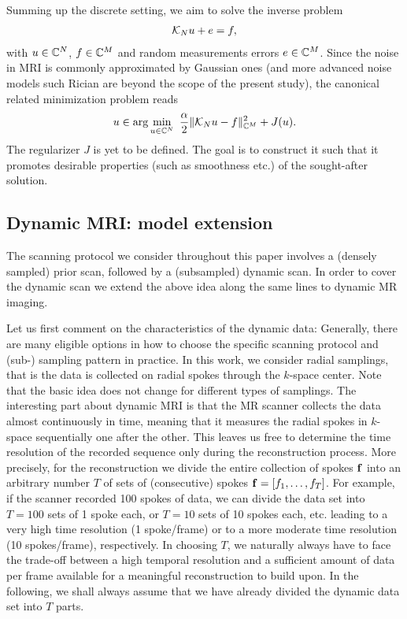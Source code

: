 Summing up the discrete setting, we aim to solve the inverse problem
\begin{align}\label{eq:forward_model}
	\mathcal{K}_N u + e = f,
\end{align}
with $u \in \mathbb{C}^N$, $f \in \mathbb{C}^M$ and random measurements errors $e \in \mathbb{C}^M$. 
Since the noise in MRI is commonly approximated by  Gaussian ones (and more advanced noise models such Rician are beyond the scope of the present study), the canonical related minimization problem reads
\begin{align*}
	u \in \arg \min_{u \in \mathbb{C}^N} ~ \frac{\alpha}{2} \| \mathcal{K}_N u - f \|_{\mathbb{C}^M}^2 + J(u).
\end{align*}
The regularizer $J$ is yet to be defined. 
The goal is to construct it such that it promotes desirable properties (such as smoothness etc.) of the sought-after solution.


\subsection{Dynamic MRI: model extension}
\label{subsec:dynamic imaging}

The scanning protocol we consider throughout this paper involves a (densely sampled) prior scan, followed by a (subsampled) dynamic scan. 
In order to cover the dynamic scan we extend the above idea along the same lines to dynamic MR imaging. 

Let us first comment on the characteristics of the dynamic data: Generally, there are many eligible options in how to choose the specific scanning protocol and (sub-) sampling pattern in practice. 
In this work, we consider radial samplings, that is the data is collected on radial spokes through the $k$-space center.
Note that the basic idea does not change for different types of samplings. 
The interesting part about dynamic MRI is that the MR scanner collects the data almost continuously in time, meaning that it measures the radial spokes in $k$-space sequentially one after the other. 
This leaves us free to determine the time resolution of the recorded sequence only during the reconstruction process. 
More precisely, for the reconstruction we divide the entire collection of spokes $\mathbf{f}$ into an arbitrary number $T$ of sets of (consecutive) spokes $\mathbf{f} = [f_1, \dots, f_T]$. 
For example, if the scanner recorded 100 spokes of data, we can divide the data set into $T = 100$ sets of 1 spoke each, or $T = 10$ sets of 10 spokes each, etc. leading to a very high time resolution (1 spoke/frame) or to a more moderate time resolution (10 spokes/frame), respectively. 
In choosing $T$, we naturally always have to face the trade-off between a high temporal resolution and a sufficient amount of data per frame available for a meaningful reconstruction to build upon. 
In the following, we shall always assume that we have already divided the dynamic data set into $T$ parts. 

